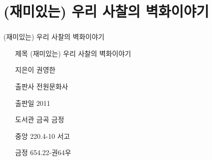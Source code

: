 \documentclass[aspectratio=1610,14pt,xcolor=pdftex,dvipsnames,table,handout]{beamer}
\begin{document}
		\section{ (재미있는) 우리 사찰의 벽화이야기 }
		\begin{frame} [t,plain]
		\frametitle{}
			\begin{block} { (재미있는) 우리 사찰의 벽화이야기 }
			\setlength{\leftmargini}{4em}			
			\begin{itemize}
				\item [제목]  	(재미있는) 우리 사찰의 벽화이야기 
				\item [지은이]	권영한 
				\item [출판사]	전원문화사 
				\item [출판일]	2011

				\item [도서관]		금곡 금정 

				\item [중앙]		220.4-10 서고
				\item [금정] 	654.22-권64우
			\end{itemize}
			\end{block}						
								
		\end{frame}						


\end{document}
